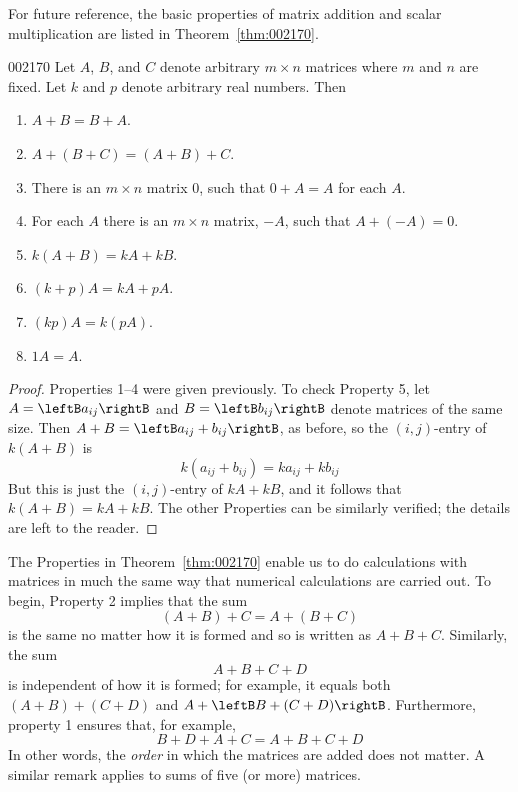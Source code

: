 For future reference, the basic properties of matrix addition and scalar multiplication are listed in Theorem~\ref{thm:002170}.


\begin{theorem}{}{002170}
Let $A$, $B$, and $C$ denote arbitrary $m \times n$ matrices where $m$ and $n$ are fixed. Let $k$ and $p$ denote arbitrary real numbers. Then


\begin{enumerate}
\item $A + B = B + A$.

\item $A + (B + C) = (A + B) + C$.

\item There is an $m \times n$ matrix $0$, such that $0 + A = A$ for each $A$.

\item For each $A$ there is an $m \times n$ matrix, $-A$, such that $A + (-A) = 0$.

\item $k(A + B) = kA + kB$.

\item $(k + p)A = kA + pA$.

\item $(kp)A = k(pA)$.

\item $1A = A$.

\end{enumerate}
\end{theorem}

\begin{proof}
Properties 1--4 were given previously. To check Property 5, let $A = \leftB a_{ij} \rightB$ and $B = \leftB b_{ij} \rightB$ denote matrices of the same size. Then $A + B = \leftB a_{ij} + b_{ij} \rightB$, as before, so the $(i, j)$-entry of $k(A + B)$ is
\begin{equation*}
k(a_{ij} + b_{ij}) = ka_{ij} + kb_{ij}
\end{equation*}
But this is just the $(i, j)$-entry of $kA + kB$, and it follows that $k(A + B) = kA + kB$. The other Properties can be similarly verified; the details are left to the reader.
\end{proof}

The Properties in Theorem~\ref{thm:002170} enable us to do calculations with matrices in much the same way that 
numerical calculations are carried out. To begin, Property 2 implies that the sum 
\begin{equation*}
(A + B) + C = A + (B + C)
\end{equation*}
 is the same no matter how it is formed and so is written as $A + B + C$. Similarly, the sum 
\begin{equation*}
A + B + C + D
\end{equation*}
 is independent of how it is formed; for example, it equals both $(A + B) + (C + D)$ and $A + \leftB B + (C + D) \rightB$. Furthermore, property 1 ensures that, for example, 
\begin{equation*}
B + D + A + C = A + B + C + D
\end{equation*} In other words, the \textit{order} in which the matrices are added does not matter. A similar remark applies to sums of five (or more) matrices.


